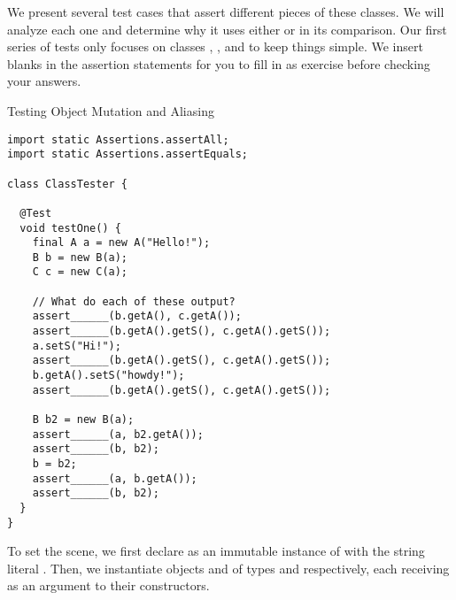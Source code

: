 
We present several test cases that assert different pieces of these classes. We will analyze each one and determine why it uses either  or  in its comparison. Our first series of tests only focuses on classes , , and  to keep things simple. We insert blanks in the assertion statements for you to fill in as exercise before checking your answers.

\begin{cl}[]{Testing Object Mutation and Aliasing}
\begin{lstlisting}[language=MyJava]
import static Assertions.assertAll;
import static Assertions.assertEquals;

class ClassTester {

  @Test
  void testOne() {
    final A a = new A("Hello!");
    B b = new B(a);
    C c = new C(a);

    // What do each of these output?
    assert______(b.getA(), c.getA());
    assert______(b.getA().getS(), c.getA().getS());
    a.setS("Hi!");
    assert______(b.getA().getS(), c.getA().getS());
    b.getA().setS("howdy!");
    assert______(b.getA().getS(), c.getA().getS());

    B b2 = new B(a);
    assert______(a, b2.getA());
    assert______(b, b2);
    b = b2;
    assert______(a, b.getA());
    assert______(b, b2);
  }
}
\end{lstlisting}
\end{cl}

To set the scene, we first declare  as an immutable instance of  with the string literal . Then, we instantiate objects  and  of types  and  respectively, each receiving  as an argument to their constructors. 

